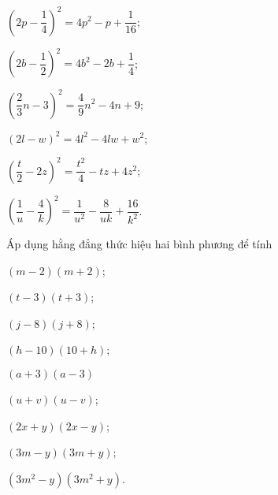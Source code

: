 \begin{vn}
{\begin{listEX}[2]
			\item $\left(2p - \dfrac{1}{4}\right)^2 = 4p^2 - p + \dfrac{1}{16}$;
			\item $(2b - \dfrac{1}{2})^2 = 4b^2 - 2b + \dfrac{1}{4}$;
			\item $\left( \dfrac{2}{3}n - 3\right)^2 = \dfrac{4}{9}n^2 - 4n + 9 $;
			\item $(2l-w)^2 = 4l^2 - 4lw + w^2$;
			\item $\left( \dfrac{t}{2}-2z\right)^2 = \dfrac{t^2}{4} - tz + 4z^2$;
			\item $\left( \dfrac{1}{u}-\dfrac{4}{k}\right)^2 = \dfrac{1}{u^2} - \dfrac{8}{uk} + \dfrac{16}{k^2}$.
		\end{listEX}
	}
\end{vn}
\begin{vn}
Áp dụng hằng đẳng thức hiệu hai bình phương để tính 
	\begin{listEX}[2]	
		\item $(m-2)(m+2)$;
		\item $(t-3)(t+3)$;
		\item $(j-8)(j+8)$;
		\item $(h-10)(10+h)$;
		\item $(a+3)(a-3)$
		\item $(u+v)(u-v)$;
		\item $(2x+y)(2x-y)$;
		\item $(3m-y)(3m+y)$;
		\item $(3m^2-y)(3m^2+y)$.
	\end{listEX}
\end{vn}
